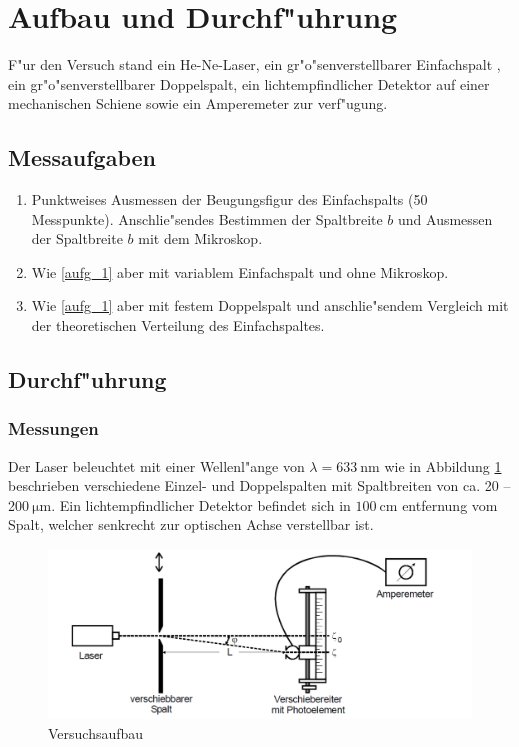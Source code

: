 \section{Aufbau und Durchf"uhrung}
	\label{sec:durchfueuhrung}
	F"ur den Versuch stand ein He-Ne-Laser, ein gr"o"senverstellbarer Einfachspalt , ein gr"o\-"sen\-ver\-stell\-bar\-er Doppelspalt, ein lichtempfindlicher Detektor auf einer mechanischen Schiene sowie ein Amperemeter zur verf"ugung.

	\subsection{Messaufgaben}
		\begin{enumerate}
			\item \label{aufg_1} Punktweises Ausmessen der Beugungsfigur des Einfachspalts (50 Messpunkte). Anschlie"sendes Bestimmen der Spaltbreite $b$ und Ausmessen der Spaltbreite $b$ mit dem Mikroskop.

			\item \label{aufg_2} Wie \ref{aufg_1} aber mit variablem Einfachspalt und ohne Mikroskop. 

			\item \label{aufg_3} Wie \ref{aufg_1} aber mit festem Doppelspalt und anschlie"sendem Vergleich mit der theo\-re\-tisch\-en Verteilung des Einfachspaltes.
		\end{enumerate}

	\subsection{Durchf"uhrung}
		\label{sec:durchfuehrung}
		\subsubsection{Messungen}
			\label{sec:messung}

			Der Laser beleuchtet mit einer Wellenl"ange von $\lambda = \SI{633}{\nano \meter}$ wie in Abbildung \ref{Versuchsaufbau} be\-schrie\-ben verschiedene Einzel- und Doppelspalten mit Spaltbreiten von ca. 20 -- 200$\SI{}{\micro \meter}$. Ein licht\-emp\-find\-lich\-er Detektor befindet sich in $\SI{100}{\centi \meter}$ entfernung vom Spalt, welcher senkrecht zur optischen Achse verstellbar ist.

			\begin{figure}[h]
					\centering
					\includegraphics[width = 14cm]{Versuchsaufbau.png}
					\caption{Versuchsaufbau}
					\label{Versuchsaufbau}
			\end{figure}


